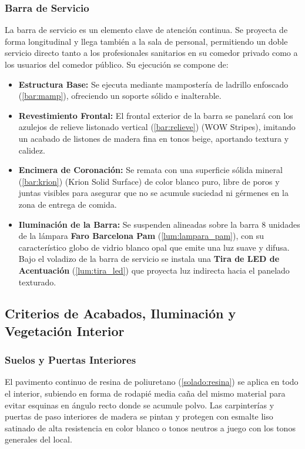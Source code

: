 \subsubsection{Barra de Servicio}
La barra de servicio es un elemento clave de atención continua. Se proyecta de forma longitudinal y llega también a la sala de personal, permitiendo un doble servicio directo tanto a los profesionales sanitarios en su comedor privado como a los usuarios del comedor público. Su ejecución se compone de:
\begin{itemize}
    \item \textbf{Estructura Base:} Se ejecuta mediante mampostería de ladrillo enfoscado (\ref{bar:mamp}), ofreciendo un soporte sólido e inalterable.
    \item \textbf{Revestimiento Frontal:} El frontal exterior de la barra se panelará con los azulejos de relieve listonado vertical (\ref{bar:relieve}) (WOW Stripes), imitando un acabado de listones de madera fina en tonos beige, aportando textura y calidez.
    \item \textbf{Encimera de Coronación:} Se remata con una superficie sólida mineral (\ref{bar:krion}) (Krion Solid Surface) de color blanco puro, libre de poros y juntas visibles para asegurar que no se acumule suciedad ni gérmenes en la zona de entrega de comida.
    \item \textbf{Iluminación de la Barra:} Se suspenden alineadas sobre la barra 8 unidades de la lámpara \textbf{Faro Barcelona Pam} (\ref{lum:lampara_pam}), con su característico globo de vidrio blanco opal que emite una luz suave y difusa. Bajo el voladizo de la barra de servicio se instala una \textbf{Tira de LED de Acentuación} (\ref{lum:tira_led}) que proyecta luz indirecta hacia el panelado texturado.
\end{itemize}

\subsection{Criterios de Acabados, Iluminación y Vegetación Interior}

\subsubsection{Suelos y Puertas Interiores}
El pavimento continuo de resina de poliuretano (\ref{solado:resina}) se aplica en todo el interior, subiendo en forma de rodapié media caña del mismo material para evitar esquinas en ángulo recto donde se acumule polvo. Las carpinterías y puertas de paso interiores de madera se pintan y protegen con esmalte liso satinado de alta resistencia en color blanco o tonos neutros a juego con los tonos generales del local.

